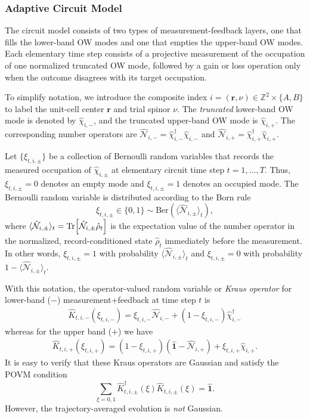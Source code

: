\documentclass[aps,prb,twocolumn,superscriptaddress,longbibliography,floatfix]{revtex4-2}
\newcommand{\mr}[1]{\mathrm{#1}}
\newcommand{\Id}{\mathbf{1}}
\newcommand{\bfr}{\boldsymbol r}
\theoremstyle{plain}
\theoremstyle{definition}
\theoremstyle{remark}
\begin{document}
\subsubsection{Adaptive Circuit Model}
The circuit model consists of two types of measurement-feedback layers, one that fills the lower-band OW modes and one that empties the upper-band OW modes. Each elementary time step consists of a projective measurement of the occupation of one normalized truncated OW mode, followed by a gain or loss operation only when the outcome disagrees with its target occupation. 

To simplify notation, we introduce the composite index $i=(\bfr, \nu)\in\mathbb{Z}^2\times\{A,B\}$ to label the unit-cell center $\bfr$ and trial spinor $\nu$. The \emph{truncated} lower-band OW mode is denoted by $\hat{\chi}_{i,-}$, and the truncated upper-band OW mode is $\hat{\chi}_{i,+}$. The corresponding number operators are $\hat{\mathcal N}_{i,-}=\hat{\chi}_{i,-}^\dagger\hat{\chi}_{i,-}$ and $\hat{\mathcal N}_{i,+}=\hat{\chi}_{i,+}^\dagger\hat{\chi}_{i,+}$.


Let $\{\xi_{t,i,\pm}\}$ be a collection of Bernoulli random variables that records the measured occupation of $\hat{\chi}_{i,\pm}$ at elementary circuit time step $t=1,\dots,T$. Thus, $\xi_{t,i,\pm}=0$ denotes an empty mode and $\xi_{t,i,\pm}=1$ denotes an occupied mode. The Bernoulli random variable is distributed according to the Born rule
\begin{equation}
    \xi_{t,i,\pm}\in\{0,1\}\sim\mr{Ber}(\langle\hat{\mathcal N}_{i,\pm}\rangle_{t}),
\end{equation}
where $\langle\hat{\mathcal N}_{i,\pm}\rangle_{t}=\Tr[\hat{\mathcal N}_{i,\pm}\hat\rho_{t}]$ is the expectation value of the number operator in the normalized, record-conditioned state $\hat\rho_{t}$ immediately before the measurement. In other words, $\xi_{t,i,\pm}=1$ with probability $\langle\hat{\mathcal N}_{i,\pm}\rangle_{t}$ and $\xi_{t,i,\pm}=0$ with probability $1-\langle\hat{\mathcal N}_{i,\pm}\rangle_{t}$.

With this notation, the operator-valued random variable or \emph{Kraus operator} for lower-band ($-$) measurement+feedback at time step $t$ is
\begin{align}
    \hat{K}_{t,i,-}(\xi_{t,i,-}) = \xi_{t,i,-}\hat{\mathcal N}_{i,-} + (1-\xi_{t,i,-})\hat{\chi}_{i,-}^\dagger
\end{align}
whereas for the upper band ($+$) we have
\begin{align}
    \hat{K}_{t,i,+}(\xi_{t,i,+}) = (1-\xi_{t,i,+})\left(\hat{\Id}-\hat{\mathcal N}_{i,+}\right) + \xi_{t,i,+}\hat{\chi}_{i,+}.
\end{align}
It is easy to verify that these Kraus operators are Gaussian and satisfy the POVM condition
\begin{equation}
    \sum_{\xi=0,1}\hat K_{t,i,\pm}^{\dagger}(\xi)\hat K_{t,i,\pm}(\xi)=\hat{\Id}.
\end{equation}
However, the trajectory-averaged evolution is \emph{not} Gaussian.
\end{document}
